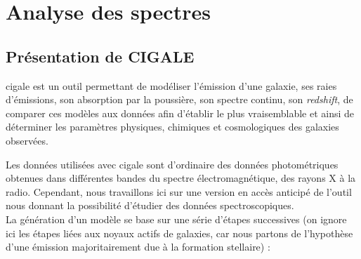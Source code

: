 \documentclass[12pt, a4paper]{article}
\begin{document}
\section{Analyse des spectres}

\subsection{Présentation de CIGALE}

\gls{cigale} \parencite{cigale} est un outil permettant de modéliser l'émission d'une galaxie, ses raies d'émissions, son absorption par la poussière, son spectre continu, son \textit{redshift}, de comparer ces modèles aux données afin d'établir le plus vraisemblable et ainsi de déterminer les paramètres physiques, chimiques et cosmologiques des galaxies observées.

Les données utilisées avec \gls{cigale} sont d'ordinaire des données photométriques obtenues dans différentes bandes du spectre électromagnétique, des rayons X à la radio. Cependant, nous travaillons ici sur une version en accès anticipé de l'outil nous donnant la possibilité d'étudier des données spectroscopiques.\\

La génération d'un modèle se base sur une série d'étapes successives (on ignore ici les étapes liées aux noyaux actifs de galaxies, car nous partons de l'hypothèse d'une émission majoritairement due à la formation stellaire) :
\end{document}
